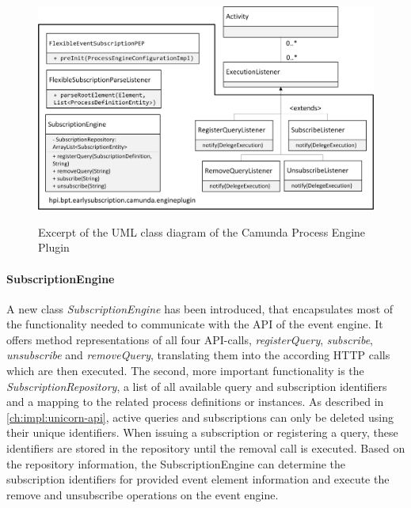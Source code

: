\begin{figure}[]
	\myfloatalign
	{\includegraphics[width=1.0\linewidth]{chapters/implementation/uml-camunda-ext.png}}
	\caption{Excerpt of the UML class diagram of the Camunda Process Engine Plugin}
	\label{fig:camunda-ext-uml}
\end{figure}



\paragraph{SubscriptionEngine}
A new class \textit{SubscriptionEngine} has been introduced, that encapsulates most of the functionality needed to communicate with the API of the event engine.
It offers method representations of all four API-calls, \textit{registerQuery}, \textit{subscribe}, \textit{unsubscribe} and \textit{removeQuery}, translating them into the according HTTP calls which are then executed.
The second, more important functionality is the \textit{SubscriptionRepository}, a list of all available query and subscription identifiers and a mapping to the related process definitions or instances.
As described in \autoref{ch:impl:unicorn-api}, active queries and subscriptions can only be deleted using their unique identifiers. 
When issuing a subscription or registering a query, these identifiers are stored in the repository until the removal call is executed.
Based on the repository information, the SubscriptionEngine can determine the subscription identifiers for provided event element information and execute the remove and unsubscribe operations on the event engine.

